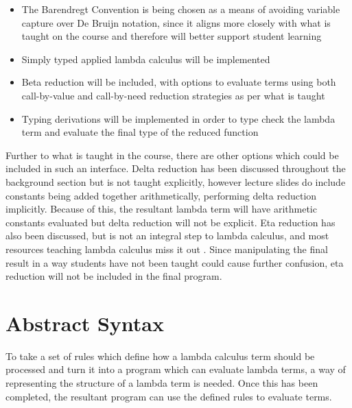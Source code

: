 \documentclass[a4paper,11pt]{report}
\begin{document}
\begin{itemize}
	\item The Barendregt Convention is being chosen as a means of avoiding variable capture over De Bruijn notation, since it aligns more closely with what is taught on the course and therefore will better support student learning
	\item Simply typed applied lambda calculus will be implemented
	\item Beta reduction will be included, with options to evaluate terms using both call-by-value and call-by-need reduction strategies as per what is taught
	\item Typing derivations will be implemented in order to type check the lambda term and evaluate the final type of the reduced function
\end{itemize}

Further to what is taught in the course, there are other options which could be included in such an interface.  Delta reduction has been discussed throughout the background section but is not taught explicitly, however lecture slides do include constants being added together arithmetically, performing delta reduction implicitly. Because of this, the resultant lambda term will have arithmetic constants evaluated but delta reduction will not be explicit. Eta reduction has also been discussed, but is not an integral step to lambda calculus, and most resources teaching lambda calculus miss it out \cite{Acar2008} \cite{Barendregt2000} \cite{Gay2019} \cite{Horowitz2013} \cite{Rojas1998} \cite{Hankin2004}. Since manipulating the final result in a way students have not been taught could cause further confusion, eta reduction will not be included in the final program.

\section{Abstract Syntax}

To take a set of rules which define how a lambda calculus term should be processed and turn it into a program which can evaluate lambda terms, a way of representing the structure of a lambda term is needed. Once this has been completed, the resultant program can use the defined rules to evaluate terms.\\
\end{document}
